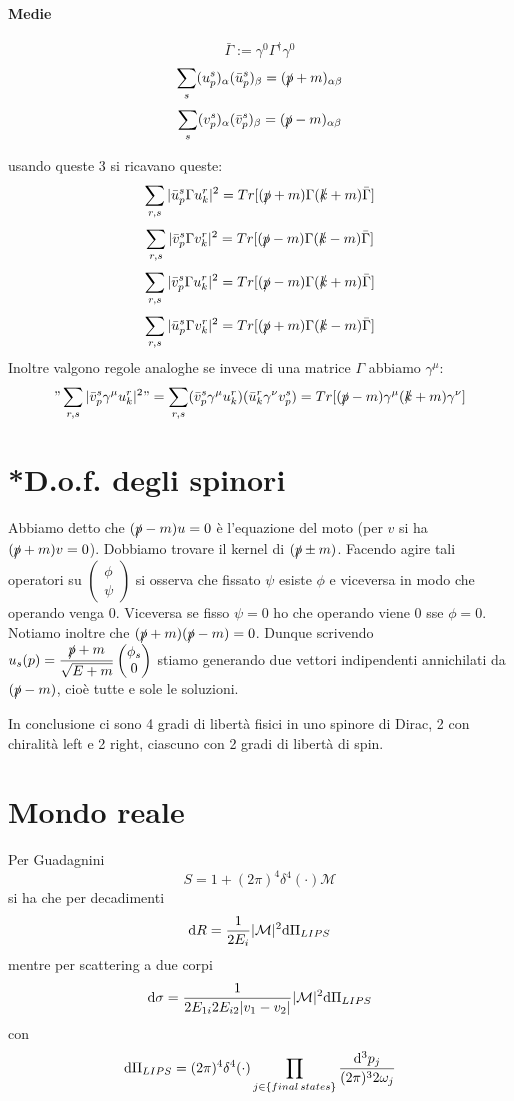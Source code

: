 \documentclass[12pt,a4paper]{article}
\begin{document}
	\paragraph{Medie}
	\[ \bar{\Gamma} := \gamma^0 \Gamma^\dagger \gamma^0 \]
	\[ \sum_s (u^s_p)_\alpha (\bar{u}^s_p)_\beta = (\slashed{p}+m)_{\alpha\beta} \]
	\[ \sum_s (v^s_p)_\alpha (\bar{v}^s_p)_\beta = (\slashed{p}-m)_{\alpha\beta} \]
	
	usando queste 3 si ricavano queste:
	\[ \sum_{r,s}|\bar{u}^s_p \Gamma u^r_k|^2 = Tr[(\slashed{p}+m) \Gamma (\slashed{k}+m) \bar{\Gamma}] \]
	\[ \sum_{r,s}|\bar{v}^s_p \Gamma v^r_k|^2 = Tr[(\slashed{p}-m) \Gamma (\slashed{k}-m) \bar{\Gamma}] \]
	\[ \sum_{r,s}|\bar{v}^s_p \Gamma u^r_k|^2 = Tr[(\slashed{p}-m) \Gamma (\slashed{k}+m) \bar{\Gamma}] \]
	\[ \sum_{r,s}|\bar{u}^s_p \Gamma v^r_k|^2 = Tr[(\slashed{p}+m) \Gamma (\slashed{k}-m) \bar{\Gamma}] \]
	Inoltre valgono regole analoghe se invece di una matrice $\Gamma$ abbiamo $\gamma^\mu$:
	\[ "\sum_{r,s}|\bar{v}^s_p \gamma^\mu u^r_k|^2" = \sum_{r,s}(\bar{v}^s_p \gamma^\mu u^r_k)(\bar{u}^r_k \gamma^\nu v^s_p) = Tr[(\slashed{p}-m) \gamma^\mu (\slashed{k}+m) \gamma^\nu] \]
	
	
	\section{*D.o.f. degli spinori}
	Abbiamo detto che $(\slashed{p} -m)u=0$ è l'equazione del moto (per $v$ si ha $(\slashed{p}+m)v=0$). Dobbiamo trovare il kernel di $(\slashed{p}\pm m)$. Facendo agire tali operatori su $\begin{pmatrix}	\phi\\\psi	\end{pmatrix}$ si osserva che fissato $\psi$ esiste $\phi$ e viceversa in modo che operando venga 0. Viceversa se fisso $\psi=0$ ho che operando viene 0 sse $\phi=0$. Notiamo inoltre che $(\slashed{p}+m)(\slashed{p}-m) = 0$. Dunque scrivendo $u_s(p) = \dfrac{\slashed{p}+m}{\sqrt{E+m}} \begin{pmatrix}	\phi_s\\0	\end{pmatrix} $ stiamo generando due vettori indipendenti annichilati da $(\slashed{p}-m)$, cioè tutte e sole le soluzioni.
	
	In conclusione ci sono 4 gradi di libertà fisici in uno spinore di Dirac, 2 con chiralità left e 2 right, ciascuno con 2 gradi di libertà di spin.
	
	\section{Mondo reale}
	Per Guadagnini
	\[ S = 1 + (2\pi)^4 \delta^4(\cdot) \mathcal{M} \]
	si ha che per decadimenti
	\[ \mathrm{d} R = \dfrac{1}{2E_i} |\mathcal{M}|^2 \mathrm{d} \Pi_{LIPS} \]
	mentre per scattering a due corpi
	\[ \mathrm{d} \sigma = \dfrac{1}{2 E_{1i} 2 E_{i2} |v_1 - v_2| } |\mathcal{M}|^2 \mathrm{d} \Pi_{LIPS} \]
	con
	\[ \mathrm{d} \Pi_{LIPS} = (2\pi)^4 \delta^4(\cdot) \prod_{j\in \{ final\,states \}} \dfrac{\mathrm{d}^3 p_j}{(2\pi)^3 2\omega_j} \]
	
\end{document}
